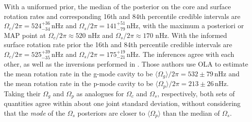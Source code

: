 \begin{table}
\caption{best-fitting rotation profile parameters given observed $\ell = 1$ and $2$ rotational splittings of \thestar\ from optimally localised averages (OLA) \citep{deheuvels_seismic_2014} and forward modelling with flat and informed ($\Omega_s/2\pi = 172 \pm 21$ nHz) priors. OLA does not place constraints on the rotation profile outside the g- and p-mode cavities in the core and at the star's surface, respectively. $p$ is more precisely measured with the introduction of the informed prior when forward modelling.}
\label{tab:results_table}
\end{table}


With a uniformed prior, the median of the posterior on the core and surface rotation rates and corresponding 16th and 84th percentile credible intervals are $\Omega_c/2\pi = 524^{+36}_{-34}\,\mathrm{nHz}$ and $\Omega_s/2\pi = {141}^{+51}_{-79}\,\mathrm{nHz}$, with the maximum a posteriori or MAP point at $\Omega_c/2\pi \approx 520$ nHz and $\Omega_s/2\pi \approx 170$ nHz. With the informed surface rotation rate prior the 16th and 84th percentile credible intervals are $\Omega_c/2\pi = 525^{+39}_{-35}\,\mathrm{nHz}$ and $\Omega_s/2\pi = {175}^{+19}_{-21}\,\mathrm{nHz}$. The inferences agree with each other, as well as the inversions performed in \citet{deheuvels_seismic_2014}. Those authors use OLA to estimate the mean rotation rate in the g-mode cavity to be $\langle\Omega_g\rangle/2\pi = 532 \pm 79\,\mathrm{nHz}$ and the mean rotation rate in the p-mode cavity to be $\langle\Omega_p\rangle/2\pi = 213 \pm 26\,\mathrm{nHz}$. Taking their $\Omega_g$ and $\Omega_p$ as analogues for $\Omega_c$ and $\Omega_s$, respectively, both sets of quantities agree within about one joint standard deviation, without considering that the \textit{mode} of the $\Omega_s$ posteriors are closer to $\langle\Omega_p\rangle$ than the median of $\Omega_s$. 


